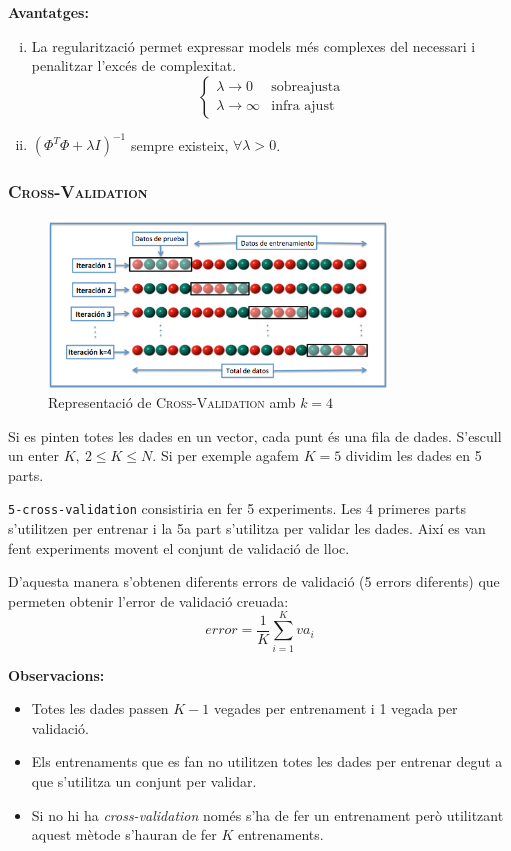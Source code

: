 \textbf{Avantatges:}

\begin{enumerate}[i)]
	\item La regularització permet expressar models més complexes del necessari i penalitzar l'excés de complexitat.
	$$
	\begin{cases}
		\lambda \rightarrow 0 &\text{sobreajusta} \\
		\lambda \rightarrow \infty &\text{infra ajust}
	\end{cases}
	$$
	
	\item $\left( \Phi^T \Phi + \lambda I \right)^{-1}$ sempre existeix, $\forall \lambda > 0$.
\end{enumerate}

\subsubsection{\textsc{Cross-Validation}}

\begin{figure}[H]
    \centering
    \includegraphics[width=0.8\textwidth]{tema_4/images/K-fold_cross_validation}
    \caption{Representació de \textsc{Cross-Validation} amb $k=4$}
\end{figure}

Si es pinten totes les dades en un vector, cada punt és una fila de dades. S'escull un enter $K, \ 2 \le K \le N$. Si per exemple agafem $K=5$ dividim les dades en 5 parts. 

\verb|5-cross-validation| consistiria en fer 5 experiments. Les 4 primeres parts s'utilitzen per entrenar i la 5a part s'utilitza per validar les dades. Així es van fent experiments movent el conjunt de validació de lloc.

D'aquesta manera s'obtenen diferents errors de validació (5 errors diferents) que permeten obtenir l'error de validació creuada:
$$
error = \frac{1}{K} \sum_{i=1}^K va_i
$$

\textbf{Observacions:}
\begin{itemize}
	\item Totes les dades passen $K - 1$ vegades per entrenament i 1 vegada per validació.
	\item Els entrenaments que es fan no utilitzen totes les dades per entrenar degut a que s'utilitza un conjunt per validar.
	\item Si no hi ha \emph{cross-validation} només s'ha de fer un entrenament però utilitzant aquest mètode s'hauran de fer $K$ entrenaments.
\end{itemize}


